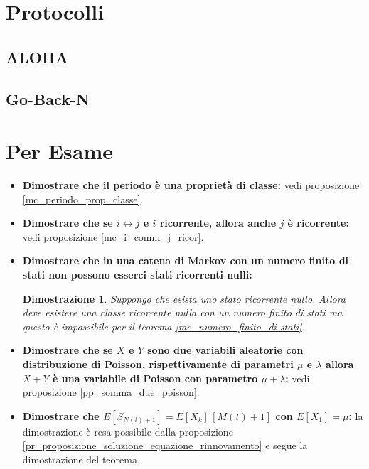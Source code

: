 \documentclass{article}
\newtheorem*{dimostrazione*}{Dimostrazione}
\begin{document}
\section{Protocolli}

\subsection{ALOHA}

\subsection{Go-Back-N}


\newpage
\section{Per Esame}


\begin{itemize}
    \item \textbf{Dimostrare che il periodo è una proprietà di classe:} vedi proposizione \ref{mc_periodo_prop_classe}.

    \item \textbf{Dimostrare che se $i \leftrightarrow j$ e $i$ ricorrente, allora anche $j$ è ricorrente:} vedi proposizione \ref{mc_i_comm_j_ricor}.

    \item \textbf{Dimostrare che in una catena di Markov con un numero finito di stati non possono esserci stati ricorrenti nulli:}
    \begin{dimostrazione*}
    Suppongo che esista uno stato ricorrente nullo. Allora deve esistere una classe ricorrente nulla con un numero finito di stati ma questo è impossibile per il teorema \ref{mc_numero_finito_di stati}.
    \end{dimostrazione*}

    \item \textbf{Dimostrare che se $X$ e $Y$ sono due variabili aleatorie con distribuzione di Poisson, rispettivamente di parametri $\mu$ e $\lambda$ allora $X+Y$ è una variabile di Poisson con parametro $\mu + \lambda$:} vedi proposizione \ref{pp_somma_due_poisson}.

    \item \textbf{Dimostrare che $E[S_{N(t) + 1}] = E[X_k]\,[M(t) + 1]$ con $E[X_1] = \mu$:} la dimostrazione è resa possibile dalla proposizione \ref{pr_proposizione_soluzione_equazione_rinnovamento} e segue la dimostrazione del teorema.
\end{itemize}
\end{document}
